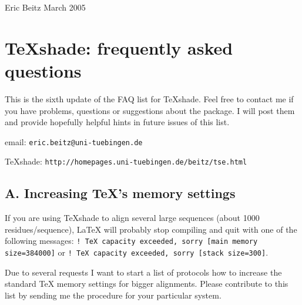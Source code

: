 \documentclass[12pt]{article}
\begin{document}
    
\noindent
Eric Beitz \hfill March 2005

\section*{\TeX{}shade: frequently asked questions }
\bigskip

This is the sixth update of the FAQ list for \TeX{}shade. Feel free to 
contact me if you have problems, questions or suggestions about the 
package. I will post them and provide hopefully helpful hints in 
future issues of this list.
\bigskip

\noindent
\qquad email: \texttt{eric.beitz@uni-tuebingen.de}
\smallskip

\noindent
\TeX{}shade: 
\texttt{http://homepages.uni-tuebingen.de/beitz/tse.html}


\subsection*{A. Increasing \TeX{}'s memory settings}
\medskip

    If you are using \TeX{}shade to align several large sequences (about 1000
    residues/sequence), LaTeX will probably stop compiling and quit with one
    of the following messages: 
    \texttt{!\ TeX capacity exceeded, sorry [main memory size=384000]} or 
    \texttt{!\ TeX capacity exceeded, sorry [stack size=300]}.

Due to several requests I want to start a list of protocols how
to increase the standard \TeX{} memory settings for bigger 
alignments. Please contribute to this list by sending me the
procedure for your particular system.
\end{document}
